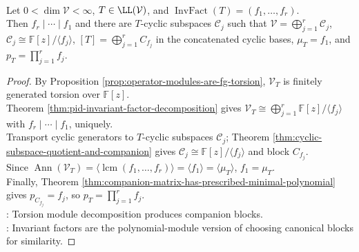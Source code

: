 \begin{theorem} \label{thm:operator-invariant-factor-skeleton} \\
Let $0<\dim\mathcal{V}<\infty$, $T\in\LL(\mathcal{V})$, and $\operatorname{InvFact}(T)=(f_1,\ldots,f_r)$.\\
Then $f_r\mid\cdots\mid f_1$ and there are $T$-cyclic subspaces $\mathcal{C}_j$ such that $\mathcal{V}=\bigoplus_{j=1}^r\mathcal{C}_j$, $\mathcal{C}_j\cong\mathbb{F}[z]/\langle f_j\rangle$, $[T]=\bigoplus_{j=1}^r C_{f_j}$ in the concatenated cyclic bases, $\mu_T=f_1$, and $p_T=\prod_{j=1}^r f_j$.
\begin{proof}
By Proposition \ref{prop:operator-modules-are-fg-torsion}, $\mathcal{V}_T$ is finitely generated torsion over $\mathbb{F}[z]$.\\
Theorem \ref{thm:pid-invariant-factor-decomposition} gives $\mathcal{V}_T\cong\bigoplus_{j=1}^r\mathbb{F}[z]/\langle f_j\rangle$ with $f_r\mid\cdots\mid f_1$, uniquely.\\
Transport cyclic generators to $T$-cyclic subspaces $\mathcal{C}_j$; Theorem \ref{thm:cyclic-subspace-quotient-and-companion} gives $\mathcal{C}_j\cong\mathbb{F}[z]/\langle f_j\rangle$ and block $C_{f_j}$.\\
Since $\operatorname{Ann}(\mathcal{V}_T)=\langle\operatorname{lcm}(f_1,\ldots,f_r)\rangle=\langle f_1\rangle=\langle\mu_T\rangle$, $f_1=\mu_T$.\\
Finally, Theorem \ref{thm:companion-matrix-has-prescribed-minimal-polynomial} gives $p_{C_{f_j}}=f_j$, so $p_T=\prod_{j=1}^r f_j$.\\
: Torsion module decomposition produces companion blocks.\\
: Invariant factors are the polynomial-module version of choosing canonical blocks for similarity.
\end{proof}
\end{theorem}
